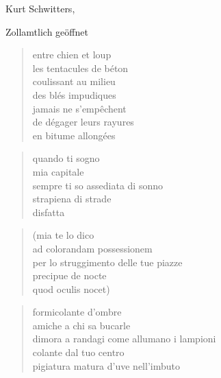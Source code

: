 \begin{volumetitlepage}
\end{volumetitlepage}


\begin{artItem}
	Kurt Schwitters, \begin{otherlanguage}{german}%
		Zollamtlich geöffnet%
	\end{otherlanguage}
\end{artItem}

	\begin{otherlanguage}{french}
		\begin{verse}
			entre chien et loup\\
			les tentacules de béton\\
			coulissant au milieu\\
			des blés impudiques\\
			jamais ne s'empêchent\\
			de dégager leurs rayures\\
			en bitume allongées
		\end{verse}
	\end{otherlanguage}

\clearpage


	\begin{verse}
		quando ti sogno\\
		mia capitale\\
		sempre ti so assediata di sonno\\
		strapiena di strade\\
		disfatta
	\end{verse}

	\begin{verse}
		(mia te lo dico\\
		ad colorandam possessionem\\
		per lo struggimento delle tue piazze\\
		precipue de nocte\\
		quod oculis nocet)
	\end{verse}

	\begin{verse}
		formicolante d’ombre\\
		amiche a chi sa bucarle\\
		dimora a randagi come allumano i lampioni\\
		colante dal tuo centro\\
		pigiatura matura d’uve nell’imbuto
	\end{verse}

